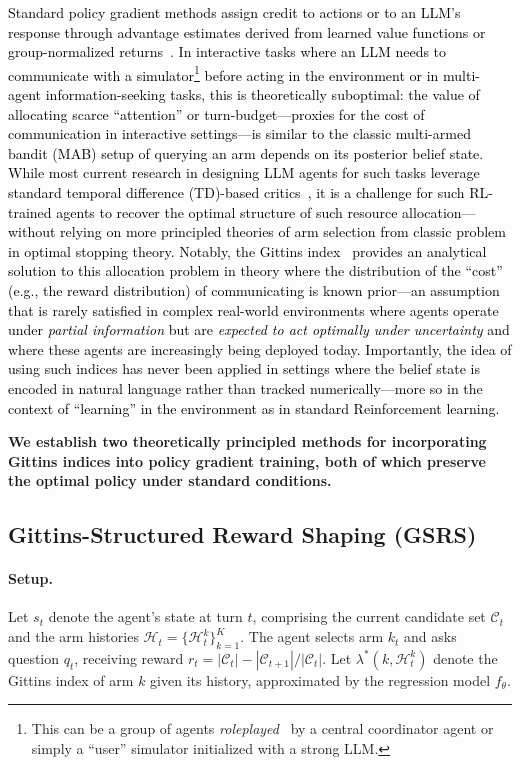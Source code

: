 \documentclass[11pt]{article}
\newcommand{\an}[1]{\textcolor{black}{#1}}
\theoremstyle{plain}
\theoremstyle{definition}
\theoremstyle{remark}
\begin{document}
\an{Standard policy gradient methods assign credit to actions or to an LLM's response through 
advantage estimates derived from learned value functions or group-normalized 
returns~\citep{sutton2018reinforcement, schulman2017proximalpolicyoptimizationalgorithms, schulman2015high, shao2024deepseekmath}. In interactive tasks where an LLM needs to communicate with a simulator\footnote{This can be a group of agents \textit{roleplayed}~\citep{ivison2023camels, nath2026collaboratedeliberateevaluatellm} by a central coordinator agent or simply a “user” simulator initialized with a strong LLM.} before acting in the environment or in multi-agent information-seeking tasks, this is theoretically 
suboptimal: the value of allocating scarce “attention” or turn-budget—proxies for the cost of communication in interactive settings—is similar to the classic multi-armed bandit (MAB) setup of querying an arm depends on its posterior belief 
state. While most current research in designing LLM agents for such tasks leverage standard temporal difference (TD)-based critics~\citep{schulman2015high}, it is a challenge for such RL-trained agents to recover the optimal structure of such resource allocation—without relying on more principled theories of arm selection from classic problem in optimal stopping theory. Notably, the Gittins index~\citep{weber1992gittins, whittle1980multi} provides an analytical solution to this 
allocation problem in theory where the distribution of the “cost” (e.g., the reward distribution) of communicating is known prior—an assumption that is rarely satisfied in complex real-world environments where agents operate under \textit{partial information} but are \textit{expected to act optimally under uncertainty} and where these agents are increasingly being deployed today. Importantly, the idea of using such indices  has never been applied in settings where the 
belief state is encoded in natural language rather than tracked numerically—more so in the context of “learning” in the environment as in standard Reinforcement learning.}

\textbf{We establish two theoretically principled methods for incorporating Gittins 
indices into policy gradient training, both of which preserve the optimal 
policy under standard conditions.}

\subsection{Gittins-Structured Reward Shaping (GSRS)}

\paragraph{Setup.} Let $s_t$ denote the agent's state at turn $t$, 
comprising the current candidate set $\mathcal{C}_t$ and the arm histories 
$\mathcal{H}_t = \{\mathcal{H}_t^k\}_{k=1}^K$. The agent selects arm $k_t$ 
and asks question $q_t$, receiving reward $r_t = |\mathcal{C}_t| - 
|\mathcal{C}_{t+1}| / |\mathcal{C}_t|$. Let $\lambda^*(k, \mathcal{H}_t^k)$ 
denote the Gittins index of arm $k$ given its history, approximated by the 
regression model $f_\theta$.
\end{document}
